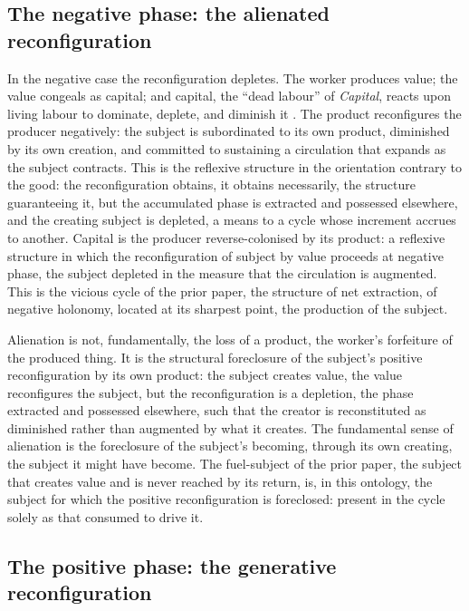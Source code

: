 \subsection{The negative phase: the alienated reconfiguration}
\label{p10:sec:alienated}

In the negative case the reconfiguration depletes. The worker produces value; the value congeals as capital; and capital, the ``dead labour'' of \emph{Capital}, reacts upon living labour to dominate, deplete, and diminish it \parencite{marx1976,marx1959}. The product reconfigures the producer negatively: the subject is subordinated to its own product, diminished by its own creation, and committed to sustaining a circulation that expands as the subject contracts. This is the reflexive structure in the orientation contrary to the good: the reconfiguration obtains, it obtains necessarily, the structure guaranteeing it, but the accumulated phase is extracted and possessed elsewhere, and the creating subject is depleted, a means to a cycle whose increment accrues to another. Capital is the producer reverse-colonised by its product: a reflexive structure in which the reconfiguration of subject by value proceeds at negative phase, the subject depleted in the measure that the circulation is augmented. This is the vicious cycle of the prior paper, the structure of net extraction, of negative holonomy, located at its sharpest point, the production of the subject.

\begin{claim}
Alienation is not, fundamentally, the loss of a product, the worker's forfeiture of the produced thing. It is the structural foreclosure of the subject's positive reconfiguration by its own product: the subject creates value, the value reconfigures the subject, but the reconfiguration is a depletion, the phase extracted and possessed elsewhere, such that the creator is reconstituted as diminished rather than augmented by what it creates. The fundamental sense of alienation is the foreclosure of the subject's becoming, through its own creating, the subject it might have become. The fuel-subject of the prior paper, the subject that creates value and is never reached by its return, is, in this ontology, the subject for which the positive reconfiguration is foreclosed: present in the cycle solely as that consumed to drive it.
\end{claim}

\subsection{The positive phase: the generative reconfiguration}
\label{p10:sec:generative-rewrite}

